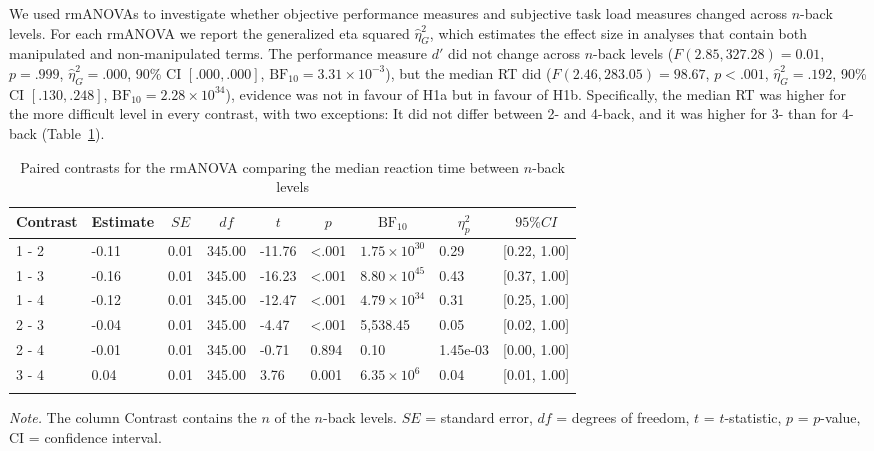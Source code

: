 \documentclass[
  man,floatsintext]{apa6}
\begin{document}
We used rmANOVAs to investigate whether objective performance measures and subjective task load measures changed across \(n\)-back levels.
For each rmANOVA we report the generalized eta squared \(\hat{\eta}^2_G\), which estimates the effect size in analyses that contain both manipulated and non-manipulated terms.
The performance measure \(d'\) did not change across \(n\)-back levels (\(F(2.85, 327.28) = 0.01\), \(p = .999\), \(\hat{\eta}^2_G = .000\), 90\% CI \([.000, .000]\), \(\mathrm{BF}_{\textrm{10}} = 3.31 \times 10^{-3}\)), but the median RT did (\(F(2.46, 283.05) = 98.67\), \(p < .001\), \(\hat{\eta}^2_G = .192\), 90\% CI \([.130, .248]\), \(\mathrm{BF}_{\textrm{10}} = 2.28 \times 10^{34}\)), evidence was not in favour of H1a but in favour of H1b.
Specifically, the median RT was higher for the more difficult level in every contrast, with two exceptions:
It did not differ between 2- and 4-back, and it was higher for 3- than for 4-back (Table~\ref{tab:H1b-contrasts}).

\begin{table}[H]

\begin{center}
\begin{threeparttable}

\caption{\label{tab:H1b-contrasts}Paired contrasts for the rmANOVA comparing the median reaction time between $n$-back levels}

\begin{tabular}{lllllllll}
\toprule
Contrast & \multicolumn{1}{c}{Estimate} & \multicolumn{1}{c}{$SE$} & \multicolumn{1}{c}{$df$} & \multicolumn{1}{c}{$t$} & \multicolumn{1}{c}{$p$} & \multicolumn{1}{c}{$\mathrm{BF}_{\textrm{10}}$} & \multicolumn{1}{c}{$\eta_{p}^{2}$} & \multicolumn{1}{c}{$95\% CI$}\\
\midrule
1 - 2 & -0.11 & 0.01 & 345.00 & -11.76 & <.001 & $1.75 \times 10^{30}$ & 0.29 & {}[0.22, 1.00]\\
1 - 3 & -0.16 & 0.01 & 345.00 & -16.23 & <.001 & $8.80 \times 10^{45}$ & 0.43 & {}[0.37, 1.00]\\
1 - 4 & -0.12 & 0.01 & 345.00 & -12.47 & <.001 & $4.79 \times 10^{34}$ & 0.31 & {}[0.25, 1.00]\\
2 - 3 & -0.04 & 0.01 & 345.00 & -4.47 & <.001 & 5,538.45 & 0.05 & {}[0.02, 1.00]\\
2 - 4 & -0.01 & 0.01 & 345.00 & -0.71 & 0.894 & 0.10 & 1.45e-03 & {}[0.00, 1.00]\\
3 - 4 & 0.04 & 0.01 & 345.00 & 3.76 & 0.001 & $6.35 \times 10^{6}$ & 0.04 & {}[0.01, 1.00]\\
\bottomrule
\addlinespace
\end{tabular}

\begin{tablenotes}[para]
\normalsize{\textit{Note.} The column Contrast contains the $n$ of the $n$-back levels. $SE$ = standard error, $df$ = degrees of freedom, $t$ = $t$-statistic, $p$ = $p$-value, CI = confidence interval.}
\end{tablenotes}

\end{threeparttable}
\end{center}

\end{table}
\end{document}
